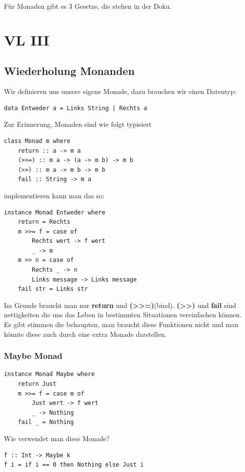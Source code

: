 \documentclass[ngerman,a4paper]{report}
\begin{document}
Für Monaden gibt es 3 Gesetze, die stehen in der Doku.

\chapter{VL III}
\section {Wiederholung Monanden}
Wir definieren uns unsere eigene Monade, dazu brauchen wir einen Datentyp:
\begin{lstlisting}
data Entweder a = Links String | Rechts a
\end{lstlisting}

Zur Erinnerung, Monaden sind wie folgt typisiert
\begin{lstlisting}
class Monad m where
	return :: a -> m a
	(>>=) :: m a -> (a -> m b) -> m b
	(>>) :: m a -> m b -> m b
	fail :: String -> m a
\end{lstlisting}

implementieren kann man das so:

\begin{lstlisting}
instance Monad Entweder where
	return = Rechts 
	m >>= f = case of
		Rechts wert -> f wert
		_ -> m
	m >> n = case of
		Rechts _ -> n
		Links message -> Links message 
	fail str = Links str
\end{lstlisting}

Im Grunde braucht man nur \textbf{return} und \textbf{(>>=)}(bind). \textbf{(>>)} und \textbf{fail} sind nettigkeiten die uns das Leben in bestimmten Situationen vereinfachen können. Es gibt stimmen die behaupten, man braucht diese Funktionen nicht und man könnte diese auch durch eine extra Monade darstellen.\\

\subsection{Maybe Monad}
\begin{lstlisting}
instance Monad Maybe where
	return Just
	m >>= f = case m of
		Just wert -> f wert
		_ -> Nothing
	fail _ = Nothing
\end{lstlisting}

Wie verwendet man diese Monade?

\begin{lstlisting}
f :: Int -> Maybe k
f i = if i == 0 then Nothing else Just i
\end{lstlisting}
\end{document}

